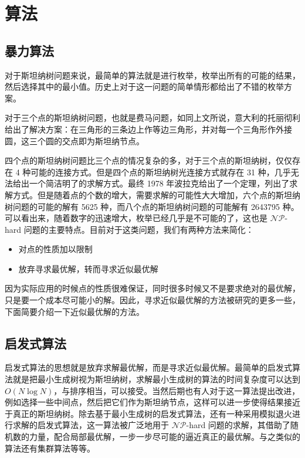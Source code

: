 \documentclass[cyan,normal,cn]{elegantnote}
\begin{document}
\section{算法}

\subsection{暴力算法}
对于斯坦纳树问题来说，最简单的算法就是进行枚举，枚举出所有的可能的结果，然后选择其中的最小值。历史上对于这一问题的简单情形都给出了不错的枚举方案。

对于三个点的斯坦纳树问题，也就是费马问题，如同上文所说，意大利的托丽彻利给出了解决方案：在三角形的三条边上作等边三角形，并对每一个三角形作外接圆，这三个圆的交点即为斯坦纳节点。

四个点的斯坦纳树问题比三个点的情况复杂的多，对于三个点的斯坦纳树，仅仅存在 4 种可能的连接方式。但是四个点的斯坦纳树光连接方式就存在 31 种，几乎无法给出一个简洁明了的求解方式。最终 1978 年波拉克给出了一个定理，列出了求解方式。但是随着点的个数的增大，需要求解的可能性大大增加，六个点的斯坦纳树问题的可能的解有 5625 种，而八个点的斯坦纳树问题的可能解有 2643795 种。可以看出来，随着数字的迅速增大，枚举已经几乎是不可能的了，这也是 $\mathcal{NP}$-hard 问题的主要特点。目前对于这类问题，我们有两种方法来简化：

\begin{itemize}
	\item 对点的性质加以限制
	\item 放弃寻求最优解，转而寻求近似最优解
\end{itemize}

因为实际应用的时候点的性质很难保证，同时很多时候又不是要求绝对的最优解，只是要一个成本尽可能小的解。因此，寻求近似最优解的方法被研究的更多一些，下面简要介绍一下近似最优解的方法。

\subsection{启发式算法}

启发式算法的思想就是放弃求解最优解，而是寻求近似最优解。最简单的启发式算法就是把最小生成树视为斯坦纳树，求解最小生成树的算法的时间复杂度可以达到 $O(N \log N)$，与排序相当，可以接受。当然后期也有人对于这一算法提出改进，例如选择一些中间点，然后把它们作为斯坦纳节点，这样可以进一步使得结果接近于真正的斯坦纳树。除去基于最小生成树的启发式算法，还有一种采用模拟退火进行求解的启发式算法，这一算法被广泛地用于 $\mathcal{NP}$-hard 问题的求解，其借助了随机数的力量，配合局部最优解，一步一步尽可能的逼近真正的最优解。与之类似的算法还有集群算法等等。
\end{document}
